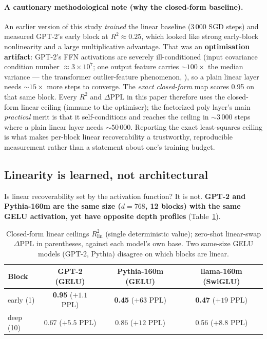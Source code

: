 \documentclass{article}
\newcommand{\Rlin}{R^2_{\mathrm{lin}}}
\newcommand{\dppl}{\Delta\mathrm{PPL}}
\begin{document}
\paragraph{A cautionary methodological note (why the closed-form baseline).} An earlier
version of this study \emph{trained} the linear baseline (3\,000 SGD steps) and measured
GPT-2's early block at $R^2 \approx 0.25$, which looked like strong early-block nonlinearity
and a large multiplicative advantage. That was an \textbf{optimisation artifact}: GPT-2's FFN
activations are severely ill-conditioned (input covariance condition number $\approx
3\times10^7$; one output feature carries ${\sim}100\times$ the median variance --- the
transformer outlier-feature phenomenon, \citealp{dettmers2022llmint8}), so a plain linear
layer needs ${\sim}15\times$ more steps to converge. The \emph{exact closed-form} map scores
0.95 on that same block. Every $R^2$ and $\dppl$ in this paper therefore uses the closed-form
linear ceiling (immune to the optimiser); the factorized poly layer's main \emph{practical}
merit is that it self-conditions and reaches the ceiling in ${\sim}3\,000$ steps where a plain
linear layer needs ${\sim}50\,000$. Reporting the exact least-squares ceiling is what makes
per-block linear recoverability a trustworthy, reproducible measurement rather than a
statement about one's training budget.

\subsection{Linearity is learned, not architectural}
\label{sec:learned}

Is linear recoverability set by the activation function? It is not. \textbf{GPT-2 and
Pythia-160m are the same size ($d = 768$, 12 blocks) with the same GELU activation, yet have
opposite depth profiles} (Table~\ref{tab:learned}).

\begin{table}[t]
  \centering
  \caption{Closed-form linear ceilings $\Rlin$ (single deterministic value); zero-shot
  linear-swap $\dppl$ in parentheses, against each model's own base. Two same-size GELU models
  (GPT-2, Pythia) disagree on which blocks are linear.}
  \label{tab:learned}
  \begin{tabular}{lccc}
    \toprule
    Block & GPT-2 (GELU) & Pythia-160m (GELU) & llama-160m (SwiGLU) \\
    \midrule
    early (1) & \textbf{0.95} ($+1.1$ PPL) & \textbf{0.45} ($+63$ PPL) & \textbf{0.47} ($+19$ PPL) \\
    deep (10) & 0.67 ($+5.5$ PPL) & 0.86 ($+12$ PPL) & 0.56 ($+8.8$ PPL) \\
    \bottomrule
  \end{tabular}
\end{table}
\end{document}
